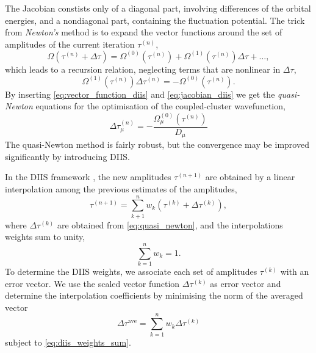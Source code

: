     The Jacobian constists only of a diagonal part, involving differences of the 
    orbital energies, and a nondiagonal part, containing the fluctuation potential.
    The trick from \emph{Newton's} method is to expand the vector functions around 
    the set of amplitudes of the current iteration $\tau^{(n)}$,
    \begin{equation}
        \Omega(\tau^{(n)} + \Delta\tau) = \Omega^{(0)}(\tau^{(n)})
            + \Omega^{(1)}(\tau^{(n)})\Delta \tau + \dots,
    \end{equation}
    which leads to a recursion relation, neglecting terms that are nonlinear in
    $\Delta \tau$,
    \begin{equation}
        \Omega^{(1)}(\tau^{(n)})\Delta \tau^{(n)} = - \Omega^{(0)}(\tau^{(n)}).
    \end{equation}
    By inserting \autoref{eq:vector_function_diis} and \autoref{eq:jacobian_diis} 
    we get the \emph{quasi-Newton} equations for the optimisation of the 
    coupled-cluster wavefunction,
    \begin{equation}
        \label{eq:quasi_newton}
        \Delta \tau^{(n)}_\mu = - \frac{\Omega^{(0)}_\mu(\tau^{(n)})}{D_\mu}
    \end{equation}
    The quasi-Newton method is fairly robust, but the convergence may be improved 
    significantly by introducing DIIS.

    In the DIIS framework \cite{pulay1980convergence}, the new amplitudes 
    $\tau^{(n+1)}$ are obtained by a linear interpolation among the previous 
    estimates of the amplitudes,
    \begin{equation}
        \tau^{(n+1)} = \sum_{k+1}^n w_k(\tau^{(k)} + \Delta\tau^{(k)}),
    \end{equation}
    where $\Delta\tau^{(k)}$ are obtained from \autoref{eq:quasi_newton}, and 
    the interpolations weights sum to unity,
    \begin{equation*}
        \label{eq:diis_weights_sum}
        \sum_{k=1}^n w_k = 1.
    \end{equation*}
    To determine the DIIS weights, we associate each set of amplitudes $\tau^{(k)}$ 
    with an error vector. We use the scaled vector function $\Delta\tau^{(k)}$ as 
    error vector and determine the interpolation coefficients by minimising the norm of 
    the averaged vector
    \begin{equation}
        \Delta \tau^{\text{ave}} = \sum_{k=1}^n w_k \Delta \tau^{(k)}
    \end{equation}
    subject to \autoref{eq:diis_weights_sum}.

